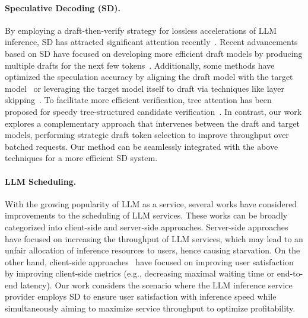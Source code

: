 

\paragraph{Speculative Decoding (SD).}
By employing a draft-then-verify strategy for lossless accelerations of LLM inference, SD has attracted significant attention recently~\citep{ryu2024closerlook-survey,xia2024sd-survey}.
Recent advancements based on SD have focused on developing more efficient draft models by producing multiple drafts for the next few tokens~\citep{cai2024medusa,cheng2024recurrentdrafterfastspeculative,li2024eagle}.
Additionally, some methods have optimized the speculation accuracy by aligning the draft model with the target model~\citep{liu2024onlinespeculativedecoding,zhou2024distillspec} or leveraging the target model itself to draft via techniques like layer skipping~\citep{zhang2024skiplayer}.
To facilitate more efficient verification, tree attention has been proposed for speedy tree-structured candidate verification~\citep{miao2024specinfer,spector2023stagedSD}.
In contrast, our work explores a complementary approach that intervenes between the draft and target models, performing strategic draft token selection to improve throughput over batched requests.
Our method can be seamlessly integrated with the above techniques for a more efficient SD system.

\paragraph{LLM Scheduling.} With the growing popularity of LLM as a service, several works have considered improvements to the scheduling of LLM services. 
These works can be broadly categorized into client-side and server-side approaches.
Server-side approaches~\citep{fu2024efficient,kim2024accelerating,liu2024optimizingspeculativedecodingserving,wang2024opttreespeculativedecodingadaptive} have focused on increasing the throughput of LLM services, which may lead to an unfair allocation of inference resources to users, hence causing starvation. 
On the other hand, client-side approaches~\citep{liu2024andes,sheng2024fairness} have focused on improving user satisfaction by improving client-side metrics (e.g., decreasing maximal waiting time or end-to-end latency).
Our work considers the scenario where the LLM inference service provider employs SD to ensure user satisfaction with inference speed while simultaneously aiming to maximize service throughput to optimize profitability.

